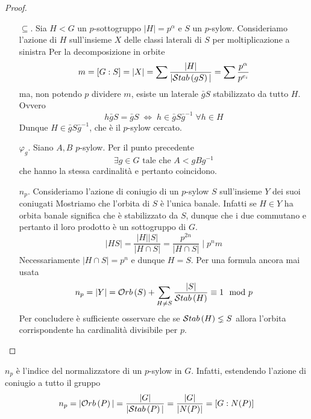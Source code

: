 \begin{multicols}{2}
\begin{proof}
\begin{itemize}
		\item[$ \subseteq $.] Sia $ H < G $ un $ p $-sottogruppo $ |H| = p^\alpha $ e $ S $ un $ p $-sylow. Consideriamo l'azione di $ H $ sull'insieme $ X $ delle classi laterali di $ S $ per moltiplicazione a sinistra
		Per la decomposizione in orbite
		\[ m=[G:S]=|X| = \sum\frac{|H|}{|\mathcal{S}tab\left( gS \right)|} = \sum\frac{p^\alpha}{p^{e_i}} \]
		ma, non potendo $ p $ dividere $ m $, esiste un laterale $ \bar{g}S $ stabilizzato da tutto $ H $. Ovvero
		\[ h\bar{g}S = \bar{g}S \;\Leftrightarrow\; h \in \bar{g}S\bar{g}^{-1} \; \forall h \in H \]
		Dunque $ H \in \bar{g}S\bar{g}^{-1} $, che è il $ p $-sylow cercato.
		
		\item[$ \varphi_g $.] Siano $ A, B $ $ p $-sylow. Per il punto precedente  \[ \exists g \in G \text{ tale che } A < gBg^{-1} \]
		che hanno la stessa cardinalità e pertanto coincidono.
		\item[$ n_p $.] Consideriamo l'azione di coniugio di un $ p $-sylow $ S $ sull'insieme $ Y $ dei suoi coniugati
		Mostriamo che l'orbita di $ S $ è l'unica banale. Infatti se $ H \in Y $ ha orbita banale significa che è stabilizzato da $ S $, dunque che i due commutano e pertanto il loro prodotto è un sottogruppo di $ G $. \[ |HS| = \frac{|H||S|}{|H \cap S|} = \frac{p^{2n}}{|H \cap S|} \mid p^nm \] Necessariamente $ |H \cap S| = p^n $ e dunque $ H = S $. Per una formula ancora mai usata
		\[ n_p = |Y| = \mathcal{O}rb\left( S \right) + \sum_{H \neq S}\frac{|S|}{\mathcal{S}tab\left( H \right)} \equiv 1 \mod{p} \]
		Per concludere è sufficiente osservare che se $ \mathcal{S}tab\left( H \right) \lneq S $ allora l'orbita corrispondente ha cardinalità divisibile per $ p $.
	\end{itemize}
\end{proof}

\begin{remark}
	$ n_p $ è l'indice del normalizzatore di un $ p$-sylow in $ G $. Infatti, estendendo l'azione di coniugio a tutto il gruppo
	\[ n_p = |\mathcal{O}rb\left( P \right)| = \frac{|G|}{|\mathcal{S}tab\left( P \right)|} = \frac{|G|}{|N(P)|} = [G : N(P)] \]
\end{remark}


\end{multicols}
